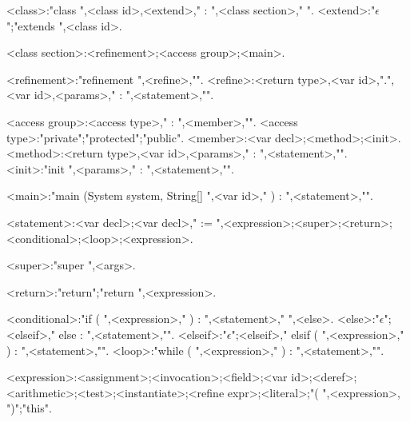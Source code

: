 \begin{grammar}

<class>:"class ",<class id>,<extend>," : ",<class section>,"{\small *} ".
<extend>:"$\epsilon$";"extends ",<class id>.

<class section>:<refinement>;<access group>;<main>.

<refinement>:"refinement ",<refine>,"{\small *}".
<refine>:<return type>,<var id>,".",<var id>,<params>," : ",<statement>,"{\small *}".

<access group>:<access type>," : ",<member>,"{\small *}".
<access type>:"private";"protected";"public".
<member>:<var decl>;<method>;<init>.
<method>:<return type>,<var id>,<params>," : ",<statement>,"{\small *}".
<init>:"init ",<params>," : ",<statement>,"{\small *}".

<main>:"main (System system, String[] ",<var id>," ) : ",<statement>,"{\small *}".

<statement>:<var decl>;<var decl>," := ",<expression>;<super>;<return>;<conditional>;<loop>;<expression>.

<super>:"super ",<args>.

<return>:"return";"return ",<expression>.

<conditional>:"if ( ",<expression>," ) :  ",<statement>,"{\small *} ",<else>.
<else>:"$\epsilon$";<elseif>," else : ",<statement>,"{\small *}".
<elseif>:"$\epsilon$";<elseif>," elsif ( ",<expression>," ) : ",<statement>,"{\small *}".
<loop>:"while ( ",<expression>," ) : ",<statement>,"{\small *}".

<expression>:<assignment>;<invocation>;<field>;<var id>;<deref>;<arithmetic>;<test>;<instantiate>;<refine expr>;<literal>;"( ",<expression>, ")";"this".


\end{grammar}
